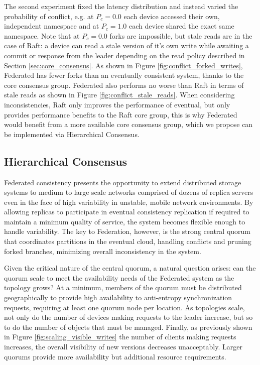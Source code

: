 \documentclass{article}
\begin{document}
The second experiment fixed the latency distribution and instead varied the probability of conflict, e.g. at $P_c=0.0$ each device accessed their own, independent namespace and at $P_c=1.0$ each device shared the exact same namespace. Note that at $P_c=0.0$ forks are impossible, but stale reads are in the case of Raft: a device can read a stale version of it's own write while awaiting a commit or response from the leader depending on the read policy described in Section \ref{sec:core_consensus}. As shown in Figure \ref{fig:conflict_forked_writes}, Federated has fewer forks than an eventually consistent system, thanks to the core consensus group. Federated also performs no worse than Raft in terms of stale reads as shown in Figure \ref{fig:conflict_stale_reads}. When considering inconsistencies, Raft only improves the performance of eventual, but only provides performance benefits to the Raft core group, this is why Federated would benefit from a more available core consensus group, which we propose can be implemented via Hierarchical Consensus.

\subsection{Hierarchical Consensus}
\label{sec:hierarchical}

Federated consistency presents the opportunity to extend distributed storage systems to medium to large scale networks comprised of dozens of replica servers even in the face of high variability in unstable, mobile network environments. By allowing replicas to participate in eventual consistency replication if required to maintain a minimum quality of service, the system becomes flexible enough to handle variability. The key to Federation, however, is the strong central quorum that coordinates partitions in the eventual cloud, handling conflicts and pruning forked branches, minimizing overall inconsistency in the system.

Given the critical nature of the central quorum, a natural question arises: can the quorum scale to meet the availability needs of the Federated system as the topology grows? At a minimum, members of the quorum must be distributed geographically to provide high availability to anti-entropy synchronization requests, requiring at least one quorum node per location. As topologies scale, not only do the number of devices making requests to the leader increase, but so to do the number of objects that must be managed. Finally, as previously shown in Figure \ref{fig:scaling_visible_writes} the number of clients making requests increases, the overall visibility of new versions decreases unacceptably. Larger quorums provide more availability but additional resource requirements.
\end{document}
